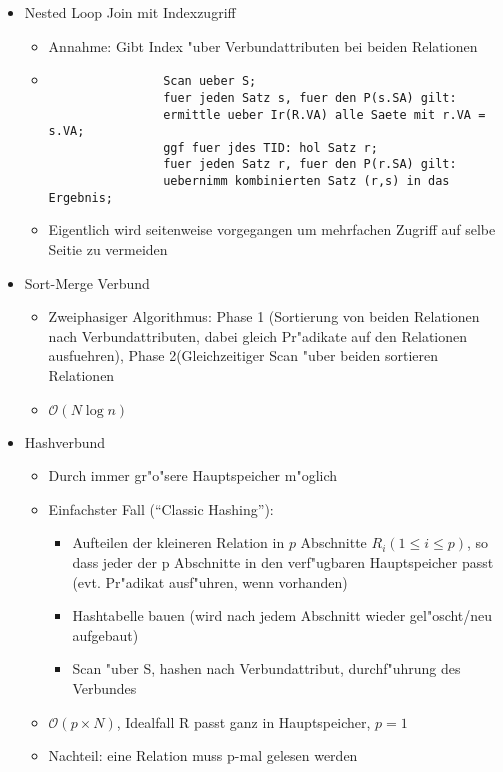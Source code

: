 \documentclass[a4paper, 12pt]{scrartcl}
\begin{document}
\begin{itemize}
	\item
		Nested Loop Join mit Indexzugriff
		\begin{itemize}
			\item
				Annahme: Gibt Index "uber Verbundattributen bei beiden Relationen
			\item
				\begin{lstlisting}
				Scan ueber S;
				fuer jeden Satz s, fuer den P(s.SA) gilt:
				ermittle ueber Ir(R.VA) alle Saete mit r.VA = s.VA;
				ggf fuer jdes TID: hol Satz r;
				fuer jeden Satz r, fuer den P(r.SA) gilt:
				uebernimm kombinierten Satz (r,s) in das Ergebnis;
				\end{lstlisting}
			\item
				Eigentlich wird seitenweise vorgegangen um mehrfachen Zugriff auf selbe Seitie zu vermeiden
		\end{itemize}
	\item
		Sort-Merge Verbund
		\begin{itemize}
			\item
				Zweiphasiger Algorithmus: Phase 1 (Sortierung von beiden Relationen nach Verbundattributen, dabei gleich Pr"adikate auf den Relationen ausfuehren), Phase 2(Gleichzeitiger Scan "uber beiden sortieren Relationen
			\item
				$\mathcal{O}(N \log n)$
		\end{itemize}

	\item Hashverbund
		\begin{itemize}
			\item
				Durch immer gr"o"sere Hauptspeicher m"oglich
			\item
				Einfachster Fall (\enquote{Classic Hashing}):
				\begin{itemize}
					\item
						Aufteilen der kleineren Relation in $p$ Abschnitte $R_i(1\leq i \leq p)$, so dass jeder der p Abschnitte in den verf"ugbaren Hauptspeicher passt (evt. Pr"adikat ausf"uhren, wenn vorhanden)
					\item
						Hashtabelle bauen (wird nach jedem Abschnitt wieder gel"oscht/neu aufgebaut)
					\item
						Scan "uber S, hashen nach Verbundattribut, durchf"uhrung des Verbundes
				\end{itemize}
			\item
				$\mathcal{O}(p \times N)$, Idealfall R passt ganz in Hauptspeicher, $p = 1$
			\item
				Nachteil: eine Relation muss p-mal gelesen werden
		\end{itemize}


\end{itemize}
\end{document}
